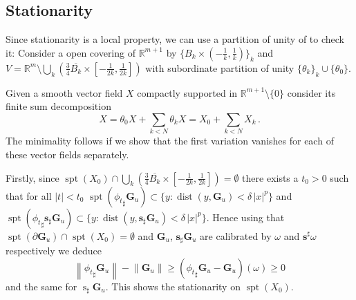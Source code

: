 \documentclass[reqno]{amsart}
\theoremstyle{definition}
\theoremstyle{remark}
\numberwithin{equation}{section}
\newcommand{\norm}[1]{\left\lVert#1\right\rVert}
\newcommand{\R}{\mathbb{R}}
\DeclareMathOperator{\spt}{spt}
\DeclareMathOperator{\dist}{dist}
\newcommand\res{\mathop{\hbox{\vrule height 7pt width .3pt depth 0pt\vrule height .3pt width 5pt depth 0pt}}\nolimits}
\newcommand{\bC}{\mathbf{C}} %
\newcommand{\bG}{\mathbf{G}} %
\begin{document}

\subsection{Stationarity}\label{subsec.minimality}
Since stationarity is a local property, we can use a partition of unity of to check it: Consider a open covering of $\R^{m+1}$ by $\{B_k\times (-\frac1k,\frac1k)\}_k$ and $V= \R^m\setminus \bigcup_k \left(\frac34\overline{B_k}\times[-\frac{1}{2k}, \frac{1}{2k}]\right)$ with subordinate partition of unity $\{\theta_k\}_k \cup \{\theta_0\}$. 

Given a smooth vector field $X$ compactly supported in $\R^{m+1}\setminus \{0\}$ consider its finite sum decomposition 
\[ X = \theta_0X + \sum_{k<N} \theta_k X = X_0 + \sum_{k <N} X_k\,. \]
The minimality follows if we show that the first variation vanishes for each of these vector fields separately. 

Firstly, since $\spt(X_0) \cap \bigcup_k \left(\frac34\overline{B_k}\times[-\frac{1}{2k}, \frac{1}{2k}]\right) = \emptyset$ there exists a $t_0>0$ such that for all $|t|<t_0$ $\spt( {\phi_t}_\sharp \bG_u) \subset \{y \colon \dist(y,\bG_{u})<\delta\,|x|^p\}$ and $\spt( {\phi_t}_\sharp \boldsymbol{s}_\sharp \bG_u) \subset \{y \colon \dist(y,\boldsymbol{s}_\sharp\bG_{u})<\delta\,|x|^p\}$. Hence using that  $\spt(\partial \bG_u) \cap \spt(X_0) =\emptyset$ and $\bG_u$, $\boldsymbol{s}_\sharp \bG_u$ are calibrated by $\omega$ and $\boldsymbol{s}^\sharp\omega$ respectively we deduce
\[ \norm{{\phi_t}_\sharp \bG_u}-\norm{\bG_u} \ge ({\phi_t}_\sharp\bG_u - \bG_u)(\omega)\ge 0 \]
and the same for $\operatorname{s}_\sharp \bG_u$. This shows the  stationarity on $\spt(X_0)$. 
\end{document}

